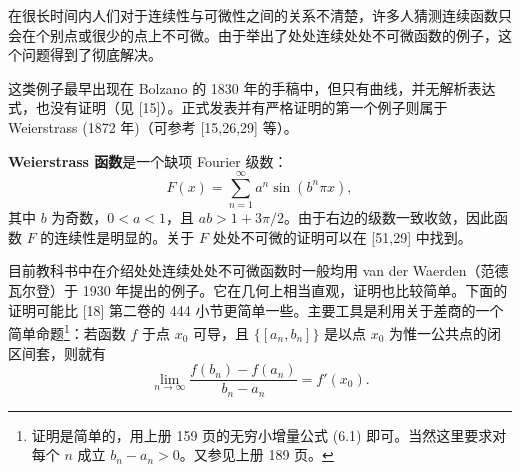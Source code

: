 在很长时间内人们对于连续性与可微性之间的关系不清楚，许多人猜测连续函数只会在个别点或很少的点上不可微。由于举出了处处连续处处不可微函数的例子，这个问题得到了彻底解决。

这类例子最早出现在 Bolzano 的 1830 年的手稿中，但只有曲线，并无解析表达式，也没有证明（见 [15]）。正式发表并有严格证明的第一个例子则属于 Weierstrass (1872 年)（可参考 [15,26,29] 等）。

\textbf{Weierstrass 函数}是一个缺项 Fourier 级数：
\[
  F(x)=\sum_{n=1}^{\infty}a^n\sin(b^n\pi x),
\]
其中 $b$ 为奇数，$0<a<1$，且 $ab>1+3\pi/2$。由于右边的级数一致收敛，因此函数 $F$ 的连续性是明显的。关于 $F$ 处处不可微的证明可以在 [51,29] 中找到。

目前教科书中在介绍处处连续处处不可微函数时一般均用 van der Waerden（范德瓦尔登）于 1930 年提出的例子。它在几何上相当直观，证明也比较简单。下面的证明可能比 [18] 第二卷的 444 小节更简单一些。主要工具是利用关于差商的一个简单命题\footnote{证明是简单的，用上册 159 页的无穷小增量公式 (6.1) 即可。当然这里要求对每个 $n$ 成立 $b_n-a_n>0$。又参见上册 189 页。}：若函数 $f$ 于点 $x_0$ 可导，且 $\{[a_n,b_n]\}$ 是以点 $x_0$ 为惟一公共点的闭区间套，则就有
\begin{equation}
  \lim_{n\to\infty}\frac{f(b_n)-f(a_n)}{b_n-a_n}=f'(x_0).
\tag{16.24}
\label{eq:16.24}
\end{equation}

